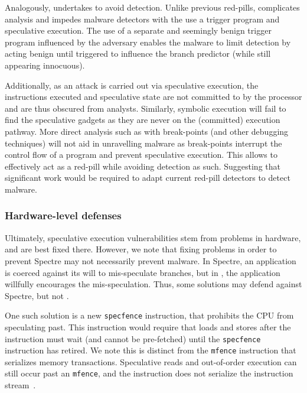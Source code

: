 Analogously, \speculake undertakes to avoid detection. Unlike previous
red-pills, \speculake complicates analysis and impedes malware detectors with
the use a trigger program and speculative execution. The use of a separate and
seemingly benign trigger program influenced by the adversary enables the
\speculake malware to limit detection by acting benign until triggered to
influence the branch predictor (while still appearing innocuous). 

Additionally, as an \speculake attack is carried out via speculative execution,
the instructions executed and speculative state are not committed to by the
processor and are thus obscured from analysts. Similarly, symbolic execution
will fail to find the speculative gadgets as they are never on the (committed)
execution pathway. More direct analysis such as with break-points (and other
debugging techniques) will not aid in unravelling \speculake malware as
break-points interrupt the control flow of a program and prevent speculative
execution. This allows \speculake to effectively act as a red-pill while
avoiding detection as such. Suggesting that significant work would be required
to adapt current red-pill detectors to detect \speculake malware.


\subsubsection{Hardware-level defenses}
Ultimately, speculative execution vulnerabilities stem from problems in
hardware, and are best fixed there. However, we note that fixing problems in
order to prevent Spectre may not necessarily prevent \speculake malware. In Spectre, an application is
coerced against its will to mis-speculate branches, but in \speculake, the
application willfully encourages the mis-speculation. Thus, some solutions may
defend against Spectre, but not \speculake.


One such solution is a new \texttt{specfence} instruction, that prohibits the
CPU from speculating past. This instruction would require that loads and stores after
the instruction must wait (and cannot be pre-fetched) until the
\texttt{specfence} instruction has retired. We note this is distinct from the
\texttt{mfence} instruction that serializes memory transactions. Speculative
reads and out-of-order execution can still occur past an \texttt{mfence}, and
the instruction does not serialize the instruction
stream~\cite{intel-software-guide}.

